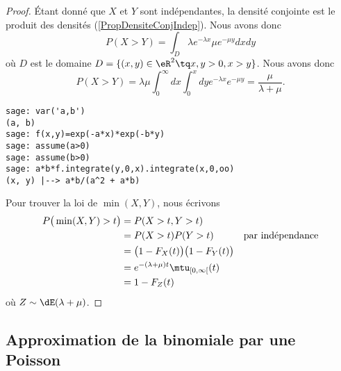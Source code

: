 \begin{proof}
	Étant donné que \( X\) et \( Y\) sont indépendantes, la densité conjointe est le produit des densités (\ref{PropDensiteConjIndep}). Nous avons donc
	\begin{equation}
		P(X>Y)=\int_D\lambda e^{-\lambda x}\mu e^{-\mu y}dxdy
	\end{equation}
	où \( D\) est le domaine \( D=\{ (x,y)\in \eR^2\tq x,y>0, x>y \}\). Nous avons donc
	\begin{equation}
		P(X>Y)=\lambda\mu\int_0^{\infty}dx\int_0^xdy  e^{-\lambda x} e^{-\mu y}=\frac{ \mu }{ \lambda+\mu }.
	\end{equation}

	\begin{verbatim}
sage: var('a,b')
(a, b)
sage: f(x,y)=exp(-a*x)*exp(-b*y)
sage: assume(a>0)
sage: assume(b>0)
sage: a*b*f.integrate(y,0,x).integrate(x,0,oo)
(x, y) |--> a*b/(a^2 + a*b)
    \end{verbatim}

	Pour trouver la loi de \( \min(X,Y)\), nous écrivons
	\begin{subequations}
		\begin{align}
			P\big( \min(X,Y)>t \big) & =P(X>t,Y>t)                                                                                  \\
			                         & =P(X>t)P(Y>t)                                                      & \text{par indépendance} \\
			                         & =\big( 1-F_X(t) \big)\big( 1-F_Y(t) \big)                                                    \\
			                         & = e^{-(\lambda+\mu)t}\mtu_{\mathopen\lbrack 0 , \infty \lbrack}(t)                           \\
			                         & =1-F_Z(t)
		\end{align}
	\end{subequations}
	où \( Z\sim \dE(\lambda+\mu)\).
\end{proof}

\subsection{Approximation de la binomiale par une Poisson}

